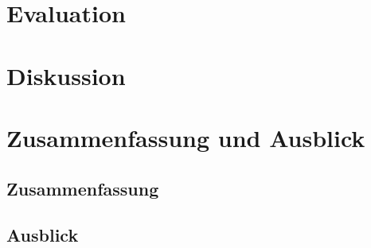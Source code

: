 






\chapter{Evaluation}

\chapter{Diskussion}

\chapter{Zusammenfassung und Ausblick}
\section{Zusammenfassung}
\section{Ausblick}
